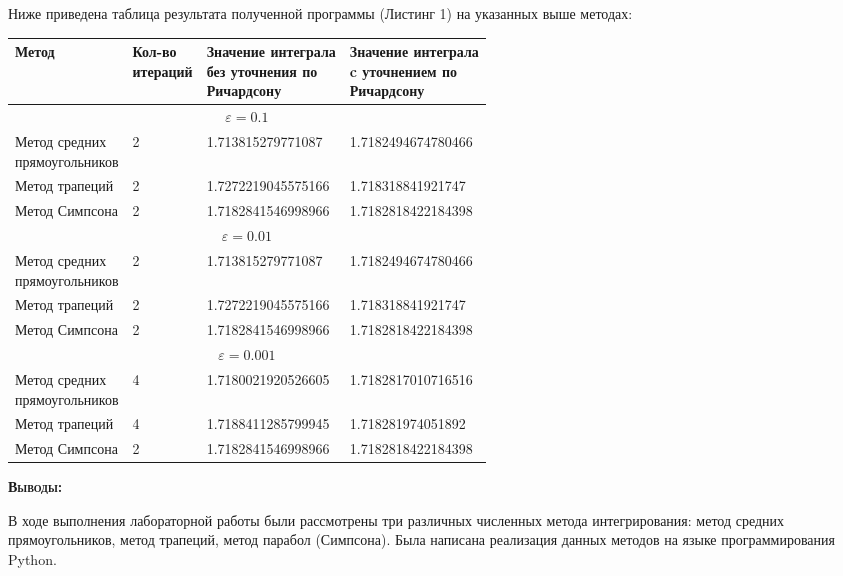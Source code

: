 \documentclass [12pt]{article}
\begin{document}
Ниже приведена таблица результата полученной программы (Листинг 1) на указанных выше методах:

\begin{center}
\begin{tabular}{ |l|l|l|l| }
  \hline
   Метод & \parbox[t]{2cm} {Кол-во \\ итераций} & \parbox[t]{4cm}{Значение интеграла \\ без уточнения по \\ Ричардсону} & \parbox[t]{4cm}{Значение интеграла \\ c уточнением по \\ Ричардсону} \\ \hline
   \\ \hline
  \parbox[t]{5cm} {Метод средних \\ прямоугольников } & 2 & 1.713815279771087 & 1.7182494674780466 \\ \hline
  Метод трапеций & 2 & 1.7272219045575166 & 1.718318841921747 \\ \hline
  Метод Симпсона & 2 & 1.7182841546998966 & 1.7182818422184398 \\ \hline
   \\ \hline
  \parbox[t]{5cm} {Метод средних \\ прямоугольников } & 2 & 1.713815279771087 & 1.7182494674780466 \\ \hline
  Метод трапеций & 2 & 1.7272219045575166 & 1.718318841921747 \\ \hline
  Метод Симпсона & 2 & 1.7182841546998966 & 1.7182818422184398 \\ \hline
   \\ \hline
  \parbox[t]{5cm} {Метод средних \\ прямоугольников } & 4 & 1.7180021920526605 & 1.7182817010716516 \\ \hline
  Метод трапеций & 4 & 1.7188411285799945 & 1.718281974051892 \\ \hline
  Метод Симпсона & 2 & 1.7182841546998966 & 1.7182818422184398 \\ \hline
\end{tabular}
\end{center}

\textsc{\textbf{Выводы:}}

В ходе выполнения лабораторной работы были рассмотрены три различных численных метода интегрирования: метод средних прямоугольников, метод трапеций, метод парабол (Симпсона). Была написана реализация данных методов на языке программирования Python.
\end{document}
